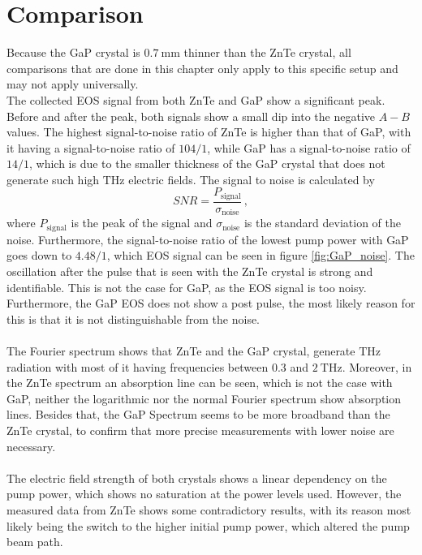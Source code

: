 \section{Comparison}
Because the GaP crystal is $\SI{0.7}{\milli\meter}$ thinner than the ZnTe crystal, all comparisons that are done in this chapter only apply to this specific setup and may not apply universally.
\\
The collected EOS signal from both ZnTe and GaP show a significant peak.
Before and after the peak, both signals show a small dip into the negative $A-B$ values.
The highest signal-to-noise ratio of ZnTe is higher than that of GaP, with it having a signal-to-noise ratio of $104/1$, while GaP has a signal-to-noise ratio of $14/1$, which is due to the smaller thickness of the GaP crystal that does not generate such high $\si{\tera\hertz}$ electric fields.
The signal to noise is calculated by 
\begin{equation}
    SNR = \frac{P_\text{signal}}{\sigma_\text{noise}}\, ,
\end{equation}
where $P_\text{signal}$ is the peak of the signal and $\sigma_\text{noise}$ is the standard deviation of the noise.
Furthermore, the signal-to-noise ratio of the lowest pump power with GaP goes down to $4.48/1$, which EOS signal can be seen in figure \ref{fig:GaP_noise}.
The oscillation after the pulse that is seen with the ZnTe crystal is strong and identifiable.
This is not the case for GaP, as the EOS signal is too noisy.
Furthermore, the GaP EOS does not show a post pulse, the most likely reason for this is that it is not distinguishable from the noise.
\\\\
The Fourier spectrum shows that ZnTe and the GaP crystal, generate $\si{\tera\hertz}$ radiation with most of it having frequencies between $0.3$ and $\SI{2}{\tera\hertz}$.
Moreover, in the ZnTe spectrum an absorption line can be seen, which is not the case with GaP, neither the logarithmic nor the normal Fourier spectrum show absorption lines.
Besides that, the GaP Spectrum seems to be more broadband than the ZnTe crystal, to confirm that more precise measurements with lower noise are necessary.
\\\\
The electric field strength of both crystals shows a linear dependency on the pump power, which shows no saturation at the power levels used.
However, the measured data from ZnTe shows some contradictory results, with its reason most likely being the switch to the higher initial pump power, which altered the pump beam path.
